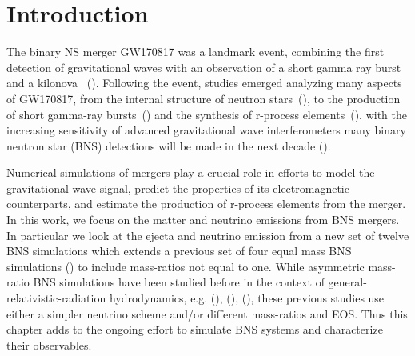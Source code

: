 \section{Introduction}


The binary NS merger GW170817 was a landmark event, combining the first detection of gravitational waves
with an observation of a short gamma ray burst and a kilonova ~(\cite{theligoscientific:2017qsa,gbm:2017lvd,2017apj...848l..13a,ajello2018fermi}). Following the event, studies emerged analyzing many aspects of GW170817, from the
internal structure of neutron stars~(\cite{read:2008iy,delpozzo:13,lackey2014,gw170817-nsradius,gw170817-pe}), to the production of short gamma-ray bursts~(\cite{moch:93,lee1999a,janka1999,gbm:2017lvd,2017apj...848l..13a,2018natur.561..355m}) and the synthesis of r-process elements~(\cite{  li:1998bw,1976apj...210..549l,rosswog:1998hy, 2005astro.ph.10256k,2010mnras.406.2650m,metzger2017,2017sci...358.1559k,2017sci...358.1556c,2017apj...848l..19c,2017sci...358.1556c,cowperthwaite:2017dyu,2017natur.551...80k,2017sci...358.1583k,2017apj...848l..32m,2017apj...848l..18n,2017natur.551...67p,2017natur.551...75s,2017apj...848l..16s,2017apj...848l..27t,2017sci...358.1565e}). with the increasing sensitivity of advanced gravitational wave
interferometers many binary neutron star (BNS) detections will
be made in the next decade (\cite{ligo2018gwtc}).

Numerical simulations of mergers
play a crucial role in efforts to model the gravitational
wave signal, predict the properties of its electromagnetic counterparts,
and estimate the production of r-process elements from the merger. In this work, we
focus on the matter and neutrino emissions from BNS mergers. In particular we look at the ejecta
and neutrino emission from a new set of twelve BNS simulations
which extends a previous set of four equal mass BNS simulations (\citet*{foucart:2015gaa}) to include mass-ratios not equal to one. While asymmetric mass-ratio
BNS simulations have been studied before in the context of general-relativistic-radiation
hydrodynamics, e.g. (\citet*{sekiguchi2016dynamical}), (\citet*{lehner2016unequal}), (\citet*{radice2016dynamical}),
these previous studies use either a simpler neutrino scheme and/or
different mass-ratios and EOS. Thus this chapter adds to the ongoing effort to simulate
BNS systems and characterize their observables.

